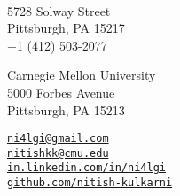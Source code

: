 \documentclass[8pt,a4paper,English]{article}
\newcommand\roottitle[1]{ \vspace{3mm} \noindent \textsc{ \normalsize #1} \vspace{1.5mm} \nopagebreak[4] \color{gray} \hrule \color{black} \vspace{2mm} \noindent \small }
\begin{document}
 \\
\vspace{-1mm}

\hspace{1mm}
\begin{minipage}{.35\textwidth} %
  5728 Solway Street \\
  Pittsburgh, PA 15217 \\
  +1 (412) 503-2077
\end{minipage} %
\begin{minipage}{.35\textwidth} %
  Carnegie Mellon University \\
  5000 Forbes Avenue \\
  Pittsburgh, PA 15213
\end{minipage}
\begin{minipage}{0.3\textwidth} %
	\href{mailto:ni4lgi@gmail.com}{\texttt{ni4lgi\mbox{}@\mbox{}gmail.com}} \\
	\href{mailto:nitishkk@cmu.edu}{\texttt{nitishkk\mbox{}@\mbox{}cmu.edu}} \\
    \href{https://www.linkedin.com/in/ni4lgi}{\texttt{in.linkedin.com/in/ni4lgi}} \\
    \href{https://github.com/nitish-kulkarni}{\texttt{github.com/nitish-kulkarni}} \\
\end{minipage}
  


\end{document}
